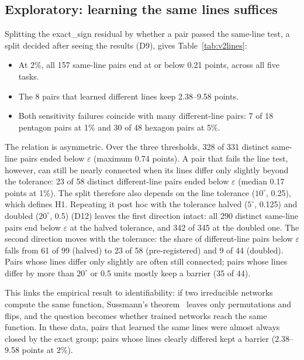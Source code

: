 \documentclass[11pt]{article}
\newcommand{\md}[1]{\textsf{#1}}
\newcommand{\eps}{\varepsilon}
\begin{document}
\subsection{Exploratory: learning the same lines suffices}
\label{sec:v2lines}

Splitting the \md{exact\_sign} residual by whether a pair passed the same-line test, a split decided after seeing the results (D9), gives Table~\ref{tab:v2lines}:
\begin{itemize}[leftmargin=*]
\item At 2\%, all 157 same-line pairs end at or below 0.21 points, across all five tasks.
\item The 8 pairs that learned different lines keep 2.38--9.58 points.
\item Both sensitivity failures coincide with many different-line pairs: 7 of 18 pentagon pairs at 1\% and 30 of 48 hexagon pairs at 5\%.
\end{itemize}
The relation is asymmetric. Over the three thresholds, 328 of 331 distinct same-line pairs ended below $\eps$ (maximum 0.74 points). A pair that fails the line test, however, can still be nearly connected when its lines differ only slightly beyond the tolerance: 23 of 58 distinct different-line pairs ended below $\eps$ (median 0.17 points at 1\%). The split therefore also depends on the line tolerance ($10^\circ$, 0.25), which defines H1. Repeating it post hoc with the tolerance halved ($5^\circ$, 0.125) and doubled ($20^\circ$, 0.5) (D12) leaves the first direction intact: all 290 distinct same-line pairs end below $\eps$ at the halved tolerance, and 342 of 345 at the doubled one. The second direction moves with the tolerance: the share of different-line pairs below $\eps$ falls from 61 of 99 (halved) to 23 of 58 (pre-registered) and 9 of 44 (doubled). Pairs whose lines differ only slightly are often still connected; pairs whose lines differ by more than $20^\circ$ or 0.5 units mostly keep a barrier (35 of 44).

This links the empirical result to identifiability: if two irreducible networks compute the same function, Sussmann's theorem~\cite{sussmann1992uniqueness} leaves only permutations and flips, and the question becomes whether trained networks reach the same function. In these data, pairs that learned the same lines were almost always closed by the exact group; pairs whose lines clearly differed kept a barrier (2.38--9.58 points at 2\%).
\end{document}

